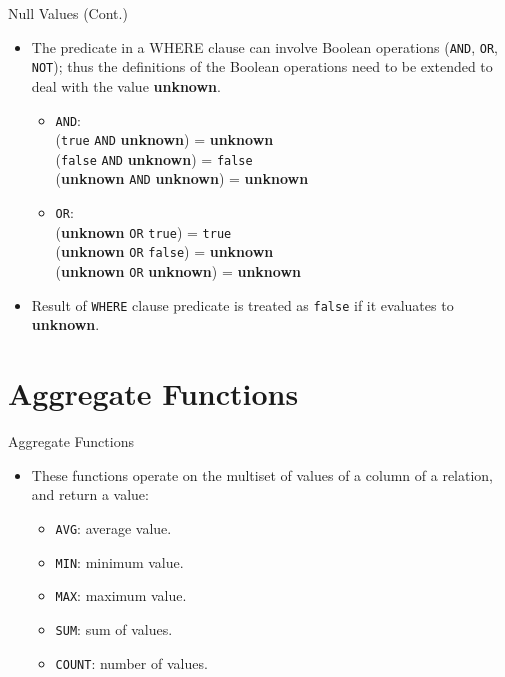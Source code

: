 \documentclass{beamer}
\begin{document}
\begin{frame}[fragile]{Null Values (Cont.)}
    \begin{itemize}
        \item The predicate in a WHERE clause can involve Boolean operations (\texttt{AND}, \texttt{OR}, \texttt{NOT}); thus the definitions of the Boolean operations need to be extended to deal with the value \textbf{unknown}.
        \begin{itemize}
            \item \texttt{AND}:\\ 
                (\texttt{true} \texttt{AND} \textbf{unknown}) = \textbf{unknown}\\
                (\texttt{false} \texttt{AND} \textbf{unknown}) = \texttt{false}\\
                (\textbf{unknown} \texttt{AND} \textbf{unknown}) = \textbf{unknown}\\
            \item \texttt{OR}:\\ 
                (\textbf{unknown} \texttt{OR} \texttt{true}) = \texttt{true}\\
                (\textbf{unknown} \texttt{OR} \texttt{false}) = \textbf{unknown}\\
                (\textbf{unknown} \texttt{OR} \textbf{unknown}) = \textbf{unknown}\\
        \end{itemize}
        \item Result of \texttt{WHERE} clause predicate is treated as \texttt{false} if it evaluates to \textbf{unknown}.
    \end{itemize}
\end{frame}

\section{Aggregate Functions}

\begin{frame}[fragile]{Aggregate Functions}
    \begin{itemize}
        \item These functions operate on the multiset of values of a column of a relation, and return a value:
        \begin{itemize}
            \item \texttt{AVG}: average value.
            \item \texttt{MIN}: minimum value.
            \item \texttt{MAX}: maximum value.
            \item \texttt{SUM}: sum of values.
            \item \texttt{COUNT}: number of values.
        \end{itemize}
    \end{itemize}
\end{frame}
\end{document}
